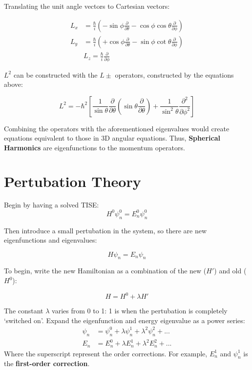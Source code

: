 \documentclass[12pt]{article}
\begin{document}
Translating the unit angle vectors to Cartesian vectors:

\begin{align*}
    L_x &= \frac{\hbar}{i}(-\sin\phi \frac{\partial}{\partial\theta} -\cos\phi \cos\theta \frac{\partial}{\partial \phi})\\
    L_y &= \frac{\hbar}{i}(+\cos\phi\frac{\partial}{\partial\theta}-\sin\phi\cot\theta\frac{\partial}{\partial \phi})\\
    &\boxed{L_z =\frac{\hbar}{i}\frac{\partial}{\partial \phi} }
\end{align*}

$L^2$ can be constructed with the $L\pm$ operators, constructed by the equations above:

\[\boxed{
L^2 = -\hbar^2\left[\frac{1}{\sin\theta}\frac{\partial}{\partial\theta}(\sin\theta\frac{\partial}{\partial\theta})+\frac{1}{\sin^2\theta}\frac{\partial^2}{\partial\phi^2}\right]
}\]

Combining the operators with the aforementioned eigenvalues would create equations equivalent to those in 3D angular equations. Thus, \textbf{Spherical Harmonics} are eigenfunctions to the momentum operators.


\section{Pertubation Theory}

Begin by having a solved TISE:
\[ H^0\psi^0_n = E^0_n\psi^0_n\]

Then introduce a small pertubation in the system, so there are new eigenfunctions and eigenvalues:

\[H\psi_n = E_n\psi_n\]

To begin, write the new Hamiltonian as a combination of the new ($H'$) and old ($H^0$):

\[H = H^0 + \lambda H'\]

The constant $\lambda$ varies from 0 to 1: 1 is when the pertubation is completely `switched on'. Expand the eigenfunction and energy eigenvalue as a power series:
\begin{align*}
  \psi_n &= \psi^0_n + \lambda \psi^1_n + \lambda^2 \psi^2_n + ...  \\
  E_n &= E^0_n + \lambda E^1_n + \lambda^2 E^2_n+...
\end{align*}
Where the superscript represent the order corrections. For example, $E^1_n$ and $\psi^1_n$ is the \textbf{first-order correction}.
\end{document}
